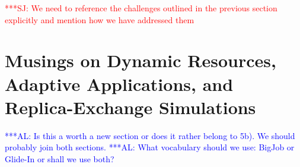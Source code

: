 \documentclass{rspublic}
\newcommand{\alnote}[1]{ {\textcolor{blue} { ***AL: #1 }}}
\newcommand{\jhanote}[1]{ {\textcolor{red} { ***SJ: #1 }}}
\newcommand{\alnote}[1]{}
\newcommand{\jhanote}[1]{}
\newcommand{\glidein}[1]{Glide-In }
\begin{document}
{%



               

  
    



\jhanote{We need to reference the challenges outlined in the previous
  section explicitly and mention how we have addressed them}

\section{Musings on Dynamic Resources, Adaptive Applications, and
  Replica-Exchange Simulations}          
\alnote{Is this a worth a new section or does it rather belong to 5b). We
should probably join both sections.}   
\alnote{What vocabulary should we use: BigJob or Glide-In or shall we use both?}

}
\end{document}

